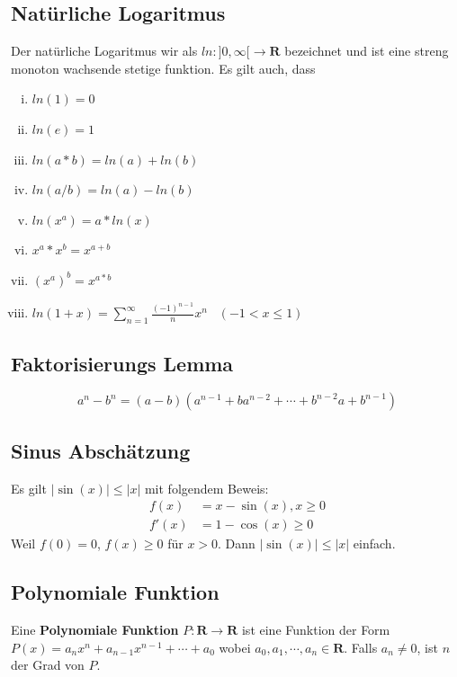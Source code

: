\documentclass[8pt]{article}
\begin{document}
\begin{multicols*}{3}
\subsection{Natürliche Logaritmus}

Der natürliche Logaritmus wir als $ln: ]0, \infty[ \rightarrow \mathbf{R}$ bezeichnet
und ist eine streng monoton wachsende stetige funktion. Es gilt auch, dass
\begin{enumerate}[(i)]
  \item $ln(1) = 0$
  \item $ln(e) = 1$
  \item $ln(a * b) = ln(a) + ln(b)$
  \item $ln(a / b) = ln(a) - ln(b)$
  \item $ln(x^a) = a * ln(x)$
  \item $x^a * x^b = x^{a + b}$
  \item $(x^a)^b = x^{a * b}$
  \item $ln(1+x) = \sum_{n=1}^{\infty} \frac{(-1)^{n-1}}{n} x^n \;\;\; (-1 < x \leq 1)$
\end{enumerate}

\subsection{Faktorisierungs Lemma}

$$
  a^n - b^n = (a-b)(a^{n-1} + ba^{n-2} + \cdots + b^{n-2}a + b^{n-1})
$$

\subsection{Sinus Abschätzung}

Es gilt $|\sin(x)| \leq |x|$ mit folgendem Beweis:
\begin{align*}
  f(x) &= x - \sin(x), x \geq 0 \\
  f'(x) &= 1 - \cos(x) \geq 0
\end{align*}
Weil $f(0) = 0$, $f(x) \geq 0$ für $x > 0$. Dann $|\sin(x)| \leq |x|$ einfach. 

\subsection{Polynomiale Funktion}

Eine \textbf{Polynomiale Funktion} $P:\mathbf{R} \rightarrow \mathbf{R}$ ist eine Funktion
der Form $P(x) = a_nx^n + a_{n-1}x^{n-1} + \cdots + a_0$ wobei $a_0, a_1, \cdots, a_n \in \mathbf{R}$.
Falls $a_n \neq 0$, ist $n$ der Grad von $P$. 


\end{multicols*}
\end{document}

